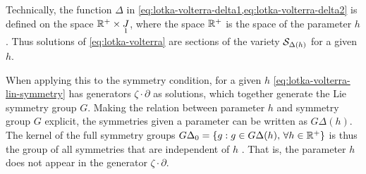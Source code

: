 Technically, the function \(\Delta\) in \cref{eq:lotka-volterra-delta1,eq:lotka-volterra-delta2} is defined on the space \(\reals^+ \times \prolong{J}{1}\), where the space \(\reals^+\) is the space of the parameter \(h\).
Thus solutions of \cref{eq:lotka-volterra} are sections of the variety \(\variety_{\Delta(h)}\) for a given \(h\).

When applying this to the symmetry condition, for a given \(h\) \cref{eq:lotka-volterra-lin-symmetry} has generators \(\zeta \cdot \partial\) as solutions, which together generate the Lie symmetry group \(G\).
Making the relation between parameter \(h\) and symmetry group \(G\) explicit, the symmetries given a parameter can be written as \(G\Delta(h)\).
The kernel of the full symmetry groups \(G\Delta_0 = \qty{g: g \in G\Delta(h),\, \forall h \in \reals^+}\) is thus the group of all symmetries that are independent of \(h\) \cite{ovsiannikov1982group}.
That is, the parameter \(h\) does not appear in the generator \(\zeta \cdot \partial\).

